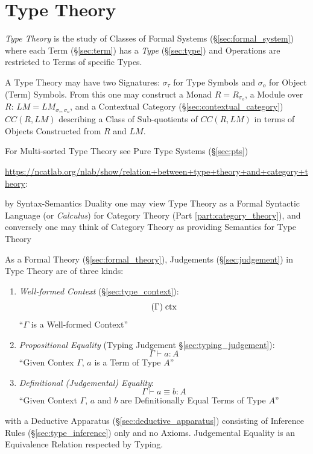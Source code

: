 \part{Type Theory}\label{part:type_theory}

\emph{Type Theory} is the study of Classes of Formal Systems
(\S\ref{sec:formal_system}) where each Term (\S\ref{sec:term}) has a \emph{Type}
(\S\ref{sec:type}) and Operations are restricted to Terms of specific Types.

A Type Theory may have two Signatures: $\sigma_\tau$ for Type Symbols and
$\sigma_o$ for Object (Term) Symbols. From this one may construct a Monad $R =
R_{\sigma_o}$, a Module over $R$: $LM = LM_{\sigma_\tau,\sigma_o}$, and a
Contextual Category (\S\ref{sec:contextual_category}) $CC(R,LM)$ describing a
Class of Sub-quotients of $CC(R,LM)$ in terms of Objects Constructed from $R$
and $LM$. \cite{voevedsky14}

For Multi-sorted Type Theory see Pure Type Systems (\S\ref{sec:pts})

\url{https://ncatlab.org/nlab/show/relation+between+type+theory+and+category+theory}:

by Syntax-Semantics Duality one may view Type Theory as a Formal Syntactic
Language (or \emph{Calculus}) for Category Theory (Part
\ref{part:category_theory}), and conversely one may think of Category Theory as
providing Semantics for Type Theory

As a Formal Theory (\S\ref{sec:formal_theory}), Judgements
(\S\ref{sec:judgement}) in Type Theory are of three kinds\cite{hott13}:
\begin{enumerate}

\item \emph{Well-formed Context} (\S\ref{sec:type_context}):
  \[
    (\Gamma) \;\mathrm{ctx}
  \]
  ``$\Gamma$ is a Well-formed Context''

\item \emph{Propositional Equality} (Typing Judgement
    \S\ref{sec:typing_judgement}):
  \[
    \Gamma \vdash a : A
  \]
  ``Given Contex $\Gamma$, $a$ is a Term of Type $A$''

\item \emph{Definitional (Judgemental) Equality}:
  \[
    \Gamma \vdash a \equiv b : A
  \]
  ``Given Context $\Gamma$, $a$ and $b$ are Definitionally Equal Terms
  of Type $A$''

\end{enumerate}
with a Deductive Apparatus (\S\ref{sec:deductive_apparatus}) consisting of
Inference Rules (\S\ref{sec:type_inference}) only and no Axioms. Judgemental
Equality is an Equivalence Relation respected by Typing.

